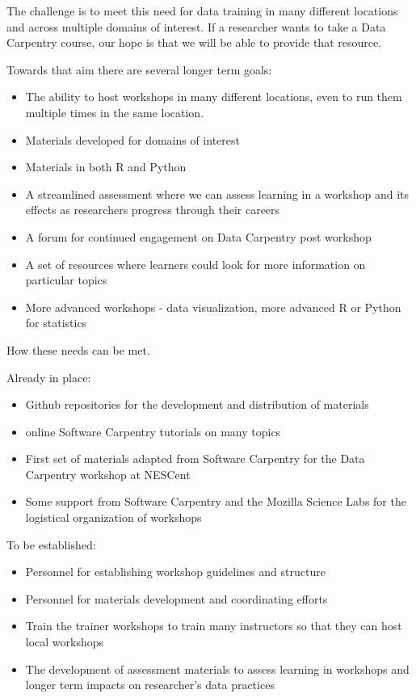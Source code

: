 \documentclass[11pt]{article}
\begin{document}
The challenge is to meet this need for data training in many different locations and across multiple domains of interest.
 If a researcher wants to take a Data Carpentry course, our hope is that we will be able to provide that resource. 
 
Towards that aim there are several longer term goals:

\begin{itemize}
\item The ability to host workshops in many different locations, even to run
them multiple times in the same location. 
\item Materials developed for domains of interest 
\item Materials in both R and Python 
\item A streamlined assessment where we can assess learning in a workshop and its effects
as researchers progress through their careers
\item A forum for continued engagement on Data Carpentry post workshop
\item A set of resources where learners could look for more information on particular topics
\item More advanced workshops - data visualization, more advanced R or Python for statistics
\end{itemize}


How these needs can be met.

Already in place:
\begin{itemize}
\item Github repositories for the development and distribution of materials
\item online Software Carpentry tutorials on many topics
\item First set of materials adapted from Software Carpentry for the Data Carpentry workshop at NESCent
\item Some support from Software Carpentry and the Mozilla Science Labs for the logistical organization of workshops
\end{itemize}

To be established:
\begin{itemize}
\item Personnel for establishing workshop guidelines and structure
\item Personnel for materials development and coordinating efforts
\item Train the trainer workshops to train many instructors so that they can host local
workshops
\item The development of assessment materials to assess learning in workshops and longer term impacts on 
researcher's data practices
\end{itemize}
\end{document}
